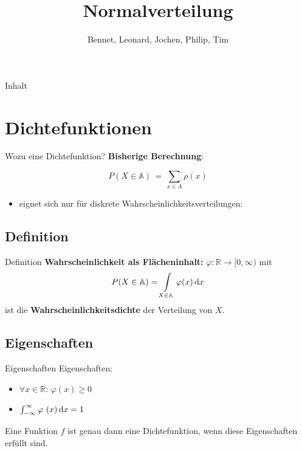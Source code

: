 \documentclass[14pt]{beamer}
\author{Bennet, Leonard, Jochen, Philip, Tim}
\title{Normalverteilung}
\institute{Herder Gymnasium Berlin}
\date{}
\begin{document}
\begin{frame}
 \titlepage
\end{frame}

\begin{frame}{Inhalt}
 \tableofcontents
\end{frame}

\section{Dichtefunktionen}
\begin{frame}{Wozu eine Dichtefunktion?}
\textbf{Bisherige Berechnung}:

{\small $$ P(X \in\mathbb{A}) \, = \, \sum_{x\in A} \rho(x) $$}
\begin{itemize}

\item eignet sich nur für diskrete Wahrscheinlichkeitsverteilungen:

\begin{itemize}
\end{itemize}
\end{itemize}

\end{frame}

\subsection{Definition}
\begin{frame}{Definition}
\textbf{Wahrscheinlichkeit als Flächeninhalt:}
$\varphi \colon \mathbb{R} \rightarrow [0,\infty)$ mit
$$P(X \in \mathbb{A})=\int\displaylimits_{X \in \mathbb{A}} \varphi(x)\,{\mathrm d}x$$
ist die \textbf{Wahrscheinlichkeitsdichte} der Verteilung von $X$.
\end{frame}

\subsection{Eigenschaften}
\begin{frame}{Eigenschaften}
Eigenschaften:
\begin{itemize}
\item $\forall x \in \mathbb{R}:\, \varphi(x)\geq 0$
\item $\int\displaylimits_{-\infty}^\infty \varphi\ (x)\,{\mathrm d}x = 1$
\end{itemize}
Eine Funktion $f$ ist genau dann eine Dichtefunktion, wenn diese Eigenschaften erfüllt sind.
\end{frame}
\end{document}
